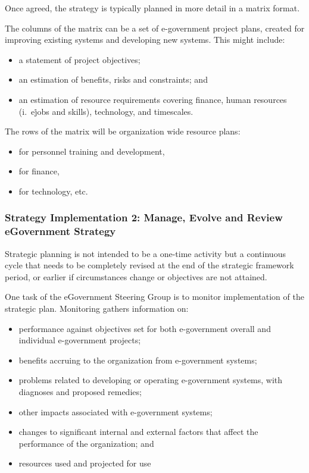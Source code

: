 Once agreed, the strategy is typically planned in more detail in a matrix format.

The columns of the matrix can be a set of e-government project plans, created for
improving existing systems and developing new systems. This might include:

\begin{itemize}
	\item a statement of project objectives; 
	\item an estimation of benefits, risks and constraints; and
	\item an estimation of resource requirements covering finance, human resources (i.\ e\. jobs and skills), technology, and timescales.
\end{itemize}

The rows of the matrix will be organization wide resource plans: 
\begin{itemize}
	\item for personnel training
	and development, 
	\item for finance, 
	\item for technology, etc.
\end{itemize}

\subsubsection{Strategy Implementation 2: Manage, Evolve and Review	eGovernment Strategy}
Strategic planning is not intended to be a
one-time activity but a continuous cycle
that needs to be completely revised at the
end of the strategic framework period, or
earlier if circumstances change or objectives
are not attained.

One task of the eGovernment Steering
Group is to monitor implementation of the strategic plan. Monitoring gathers
information on:

\begin{itemize}
	\item performance against objectives set for both e-government overall and individual
	e-government projects;
	\item benefits accruing to the organization	from e-government systems;
	\item problems related to developing or	operating e-government systems, with
	diagnoses and proposed remedies;
	\item other	impacts	associated with	e-government systems;
	\item changes to significant internal and external factors that affect the performance of the organization; and
	\item resources used and projected for use
\end{itemize}



